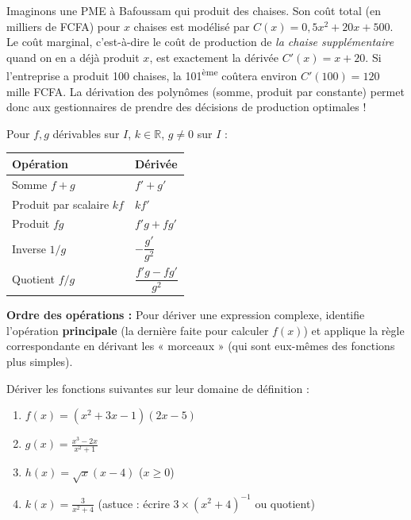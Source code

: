 \documentclass[11pt]{article}
\begin{document}
\begin{savaistu}
Imaginons une PME à Bafoussam qui produit des chaises. Son coût total (en milliers de FCFA) pour $x$ chaises est modélisé par $C(x) = 0,5x^2 + 20x + 500$.
Le coût marginal, c'est-à-dire le coût de production de \emph{la chaise supplémentaire} quand on en a déjà produit $x$, est exactement la dérivée $C'(x) = x + 20$.
Si l'entreprise a produit 100 chaises, la 101\textsuperscript{ème} coûtera environ $C'(100) = 120$ mille FCFA.
La dérivation des polynômes (somme, produit par constante) permet donc aux gestionnaires de prendre des décisions de production optimales !
\end{savaistu}

\begin{aretenir}
Pour $f, g$ dérivables sur $I$, $k \in \mathbb{R}$, $g \neq 0$ sur $I$ :
\begin{center}
\begin{tabularx}{\linewidth}{|l|X|}\hline
\textbf{Opération} & \textbf{Dérivée} \\ \hline
Somme $f+g$ & $f' + g'$ \\ \hline
Produit par scalaire $kf$ & $k f'$ \\ \hline
Produit $fg$ & $f'g + fg'$ \\ \hline
Inverse $1/g$ & $-\dfrac{g'}{g^2}$ \\ \hline
Quotient $f/g$ & $\dfrac{f'g - fg'}{g^2}$ \\ \hline
\end{tabularx}
\end{center}
\textbf{Ordre des opérations :} Pour dériver une expression complexe, identifie l'opération \textbf{principale} (la dernière faite pour calculer $f(x)$) et applique la règle correspondante en dérivant les « morceaux » (qui sont eux-mêmes des fonctions plus simples).
\end{aretenir}

\begin{exercice}[Entraînement]
Dériver les fonctions suivantes sur leur domaine de définition :
\begin{enumerate}
    \item $f(x) = (x^2 + 3x - 1)(2x - 5)$
    \item $g(x) = \frac{x^3 - 2x}{x^2 + 1}$
    \item $h(x) = \sqrt{x}(x - 4)$ \quad ($x \ge 0$)
    \item $k(x) = \frac{3}{x^2 + 4}$ \quad (astuce : écrire $3 \times (x^2+4)^{-1}$ ou quotient)
\end{enumerate}
\end{exercice}
\end{document}
